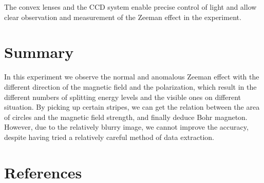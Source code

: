 \documentclass[a4paper,12pt]{article}
\begin{document}
    \par The convex lenses and the CCD system enable precise control of light and allow clear observation and measurement of the Zeeman effect in the experiment.
    
    \section{Summary} 
    \par In this experiment we observe the normal and anomalous Zeeman effect with the different direction of the magnetic field and the polarization, which result in the different numbers of splitting energy levels and the visible ones on different situation. By picking up certain stripes, we can get the relation between the area of circles and the magnetic field strength, and finally deduce Bohr magneton. However, due to the relatively blurry image, we cannot improve the accuracy, despite having tried a relatively careful method of data extraction.

\section*{References}
\printbibliography
\end{document}
